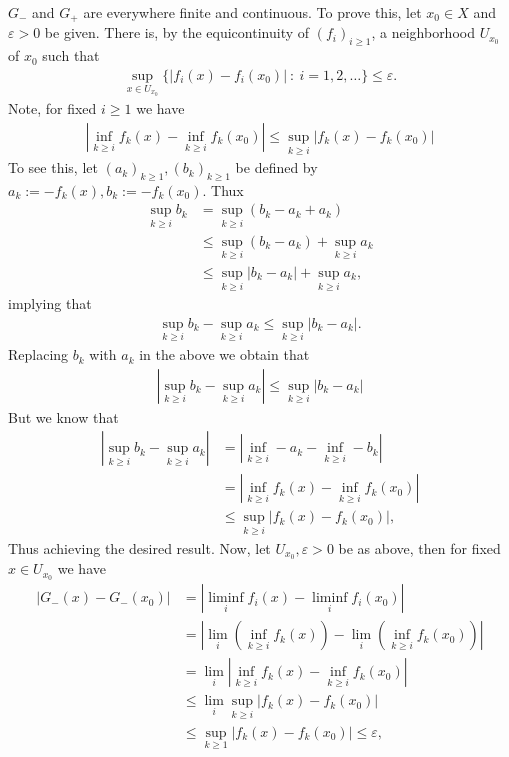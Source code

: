 \documentclass[10pt,twoside,openany,final]{memoir}
\theoremstyle{break}
\theoremstyle{Break}
\begin{document}
\noindent $G_{-}$ and $G_{+}$ are everywhere finite and continuous. To prove this, let $x_{0} \in X$ and $\varepsilon>0$ be given. There is, by the equicontinuity of $(f_{i})_{i\geq1}$, a neighborhood $U_{x_{0}}$ of $x_{0}$ such that
\begin{align*}
\sup_{x \in U_{x_{0}}} \{ |f_{i}(x)-f_{i}(x_{0})| \ : \ i=1,2,\dots \} \leq \varepsilon.
\end{align*} 
Note, for fixed $i \geq 1$ we have
\begin{align*}
| \inf_{k \geq i} f_{k}(x)-\inf_{k \geq i} f_{k}(x_{0})| \leq \sup_{k \geq i} |f_{k}(x)-f_{k}(x_{0})|  \tag{$\dagger$}
\end{align*} 
To see this, let $(a_{k})_{k\geq 1},(b_{k})_{k\geq 1}$ be defined by $a_k:=-f_k(x), b_k:=-f_k(x_0)$. Thux
\begin{align*}
\sup_{k \geq i} b_k &= \sup_{k \geq i} \left( b_k-a_k+a_k \right)\\
&\leq \sup_{k \geq i} \left(b_k-a_k\right)+\sup_{k \geq i} a_k \\
&\leq \sup_{k \geq i}\left|b_k-a_k \right| +\sup_{k \geq i} a_k,
\end{align*}
implying that
\begin{align*}
    \sup_{k \geq i} b_k - \sup_{k \geq i} a_k \leq \sup_{k \geq i}\left|b_k -a_k \right|.
\end{align*}
Replacing $b_k$ with $a_k$ in the above we obtain that
\begin{align*}
    \left| \sup_{k \geq i} b_k - \sup_{k \geq i} a_k \right| \leq \sup_{k \geq i} \left| b_k - a_k \right|
\end{align*}
But we know that
\begin{align*}
    \left| \sup_{k \geq i} b_k - \sup_{k \geq i} a_k \right| &= \left| \inf_{k \geq i} -a_k - \inf_{k \geq i} -b_k \right| \\
    &=\left| \inf_{k \geq i} f_k(x) - \inf_{k \geq i} f_k(x_0) \right|\\
    &\leq \sup_{k \geq i} \left| f_k(x) - f_k(x_0) \right|,
\end{align*}
Thus achieving the desired result. Now, let $U_{x_{0}}, \varepsilon>0$ be as above, then for fixed $x \in U_{x_{0}}$ we have
\begin{align*}
|G_{-}(x)-G_{-}(x_{0})|&=|\liminf_{i}f_{i}(x)-\liminf_{i}f_{i}(x_{0})|\\
&=|\lim_{i} (\inf_{k \geq i} f_{k}(x)) - \lim_{i} (\inf_{k \geq i} f_{k}(x_{0}))|\\
&=\lim_{i} | \inf_{k \geq i} f_{k}(x)-\inf_{k \geq i} f_{k}(x_{0})|\\
&\leq \lim_{i} \sup_{k\geq i} |f_{k}(x)-f_{k}(x_{0})| \tag{by $\dagger$}\\
&\leq \sup_{k \geq 1} | f_{k}(x)-f_{k}(x_{0})| \leq \varepsilon,
\end{align*}
\end{document}
